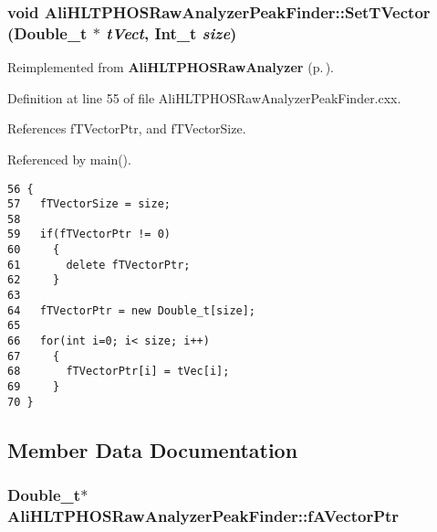 \subsubsection{\setlength{\rightskip}{0pt plus 5cm}void Ali\-HLTPHOSRaw\-Analyzer\-Peak\-Finder::Set\-TVector (Double\_\-t $\ast$ {\em t\-Vect}, Int\_\-t {\em size})\hspace{0.3cm}{\tt  [virtual]}}\label{classAliHLTPHOSRawAnalyzerPeakFinder_AliHLTPHOSRawAnalyzerPeakFindera4}




Reimplemented from {\bf Ali\-HLTPHOSRaw\-Analyzer} {\rm (p.\,\pageref{classAliHLTPHOSRawAnalyzer_AliHLTPHOSRawAnalyzerLMSa16})}.

Definition at line 55 of file Ali\-HLTPHOSRaw\-Analyzer\-Peak\-Finder.cxx.

References f\-TVector\-Ptr, and f\-TVector\-Size.

Referenced by main().

\footnotesize\begin{verbatim}56 {
57   fTVectorSize = size;
58 
59   if(fTVectorPtr != 0)
60     {
61       delete fTVectorPtr;
62     }
63   
64   fTVectorPtr = new Double_t[size];
65 
66   for(int i=0; i< size; i++)
67     {
68       fTVectorPtr[i] = tVec[i];
69     }
70 }
\end{verbatim}\normalsize 




\subsection{Member Data Documentation}
\subsubsection{\setlength{\rightskip}{0pt plus 5cm}Double\_\-t$\ast$ {\bf Ali\-HLTPHOSRaw\-Analyzer\-Peak\-Finder::f\-AVector\-Ptr}\hspace{0.3cm}{\tt  [private]}}\label{classAliHLTPHOSRawAnalyzerPeakFinder_AliHLTPHOSRawAnalyzerPeakFinderr1}




